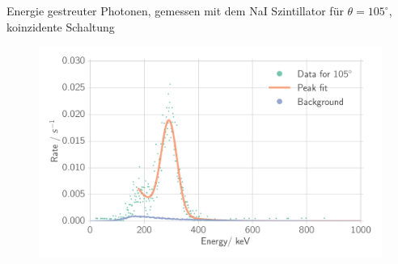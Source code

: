 \documentclass[xcolor=x11names,compress]{beamer}
\renewcommand{\(}{\begin{columns}}
\renewcommand{\)}{\end{columns}}
\newcommand{\<}[1]{\begin{column}{#1}}
\renewcommand{\>}{\end{column}}
\begin{document}
\begin{frame}[t]{Energie gestreuter Photonen, gemessen mit dem NaI Szintillator für 
    $\theta = 105^\circ$, koinzidente Schaltung}
\begin{figure}[htpb]
    \centering
    \includegraphics[width=1.0\linewidth]{../analysis/figures/coin_na_105}
    \label{fig:coin_na_30}
\end{figure}
\end{frame}
\end{document}
